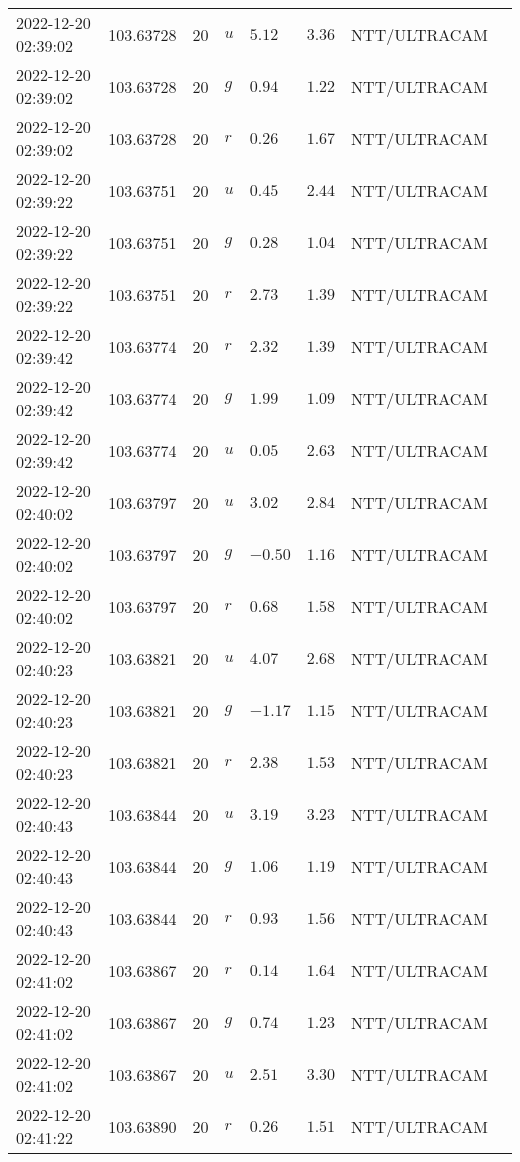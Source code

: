 \documentclass{nature_plusfigure}
\begin{document}
\begin{supplement}
\begin{center}
\begin{longtable}{llllllll}
2022-12-20 02:39:02 & 103.63728 & 20 & $u$ & $5.12$ & $3.36$ & NTT/ULTRACAM &  \\ 
2022-12-20 02:39:02 & 103.63728 & 20 & $g$ & $0.94$ & $1.22$ & NTT/ULTRACAM &  \\ 
2022-12-20 02:39:02 & 103.63728 & 20 & $r$ & $0.26$ & $1.67$ & NTT/ULTRACAM &  \\ 
2022-12-20 02:39:22 & 103.63751 & 20 & $u$ & $0.45$ & $2.44$ & NTT/ULTRACAM &  \\ 
2022-12-20 02:39:22 & 103.63751 & 20 & $g$ & $0.28$ & $1.04$ & NTT/ULTRACAM &  \\ 
2022-12-20 02:39:22 & 103.63751 & 20 & $r$ & $2.73$ & $1.39$ & NTT/ULTRACAM &  \\ 
2022-12-20 02:39:42 & 103.63774 & 20 & $r$ & $2.32$ & $1.39$ & NTT/ULTRACAM &  \\ 
2022-12-20 02:39:42 & 103.63774 & 20 & $g$ & $1.99$ & $1.09$ & NTT/ULTRACAM &  \\ 
2022-12-20 02:39:42 & 103.63774 & 20 & $u$ & $0.05$ & $2.63$ & NTT/ULTRACAM &  \\ 
2022-12-20 02:40:02 & 103.63797 & 20 & $u$ & $3.02$ & $2.84$ & NTT/ULTRACAM &  \\ 
2022-12-20 02:40:02 & 103.63797 & 20 & $g$ & $-0.50$ & $1.16$ & NTT/ULTRACAM &  \\ 
2022-12-20 02:40:02 & 103.63797 & 20 & $r$ & $0.68$ & $1.58$ & NTT/ULTRACAM &  \\ 
2022-12-20 02:40:23 & 103.63821 & 20 & $u$ & $4.07$ & $2.68$ & NTT/ULTRACAM &  \\ 
2022-12-20 02:40:23 & 103.63821 & 20 & $g$ & $-1.17$ & $1.15$ & NTT/ULTRACAM &  \\ 
2022-12-20 02:40:23 & 103.63821 & 20 & $r$ & $2.38$ & $1.53$ & NTT/ULTRACAM &  \\ 
2022-12-20 02:40:43 & 103.63844 & 20 & $u$ & $3.19$ & $3.23$ & NTT/ULTRACAM &  \\ 
2022-12-20 02:40:43 & 103.63844 & 20 & $g$ & $1.06$ & $1.19$ & NTT/ULTRACAM &  \\ 
2022-12-20 02:40:43 & 103.63844 & 20 & $r$ & $0.93$ & $1.56$ & NTT/ULTRACAM &  \\ 
2022-12-20 02:41:02 & 103.63867 & 20 & $r$ & $0.14$ & $1.64$ & NTT/ULTRACAM &  \\ 
2022-12-20 02:41:02 & 103.63867 & 20 & $g$ & $0.74$ & $1.23$ & NTT/ULTRACAM &  \\ 
2022-12-20 02:41:02 & 103.63867 & 20 & $u$ & $2.51$ & $3.30$ & NTT/ULTRACAM &  \\ 
2022-12-20 02:41:22 & 103.63890 & 20 & $r$ & $0.26$ & $1.51$ & NTT/ULTRACAM &  \\ 

\end{longtable}
\end{center}
\end{supplement}
\end{document}
